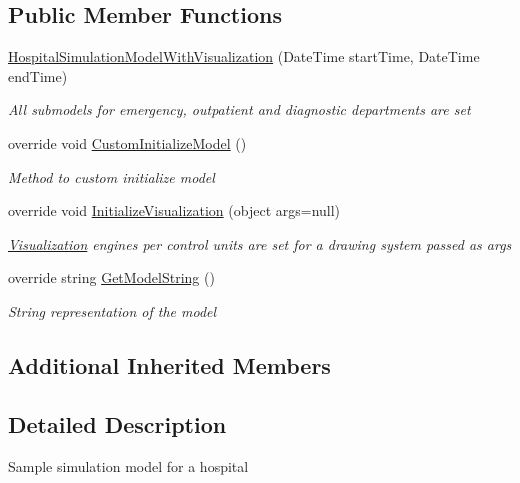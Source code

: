 \subsection*{Public Member Functions}
\begin{DoxyCompactItemize}
\item 
\hyperlink{class_sample_hospital_model_1_1_hospital_simulation_model_with_visualization_af3f3959feb5de57d43fb85427814f35e}{Hospital\+Simulation\+Model\+With\+Visualization} (Date\+Time start\+Time, Date\+Time end\+Time)
\begin{DoxyCompactList}\small\item\em All submodels for emergency, outpatient and diagnostic departments are set \end{DoxyCompactList}\item 
override void \hyperlink{class_sample_hospital_model_1_1_hospital_simulation_model_with_visualization_a24f784d57d549fc6ac37d17c2137698f}{Custom\+Initialize\+Model} ()
\begin{DoxyCompactList}\small\item\em Method to custom initialize model \end{DoxyCompactList}\item 
override void \hyperlink{class_sample_hospital_model_1_1_hospital_simulation_model_with_visualization_ab554b4540409d6967b854f33617f6b63}{Initialize\+Visualization} (object args=null)
\begin{DoxyCompactList}\small\item\em \hyperlink{namespace_sample_hospital_model_1_1_visualization}{Visualization} engines per control units are set for a drawing system passed as args \end{DoxyCompactList}\item 
override string \hyperlink{class_sample_hospital_model_1_1_hospital_simulation_model_with_visualization_a082b4f99fcc409a894c8f4c989d7fa49}{Get\+Model\+String} ()
\begin{DoxyCompactList}\small\item\em String representation of the model \end{DoxyCompactList}\end{DoxyCompactItemize}
\subsection*{Additional Inherited Members}


\subsection{Detailed Description}
Sample simulation model for a hospital 



